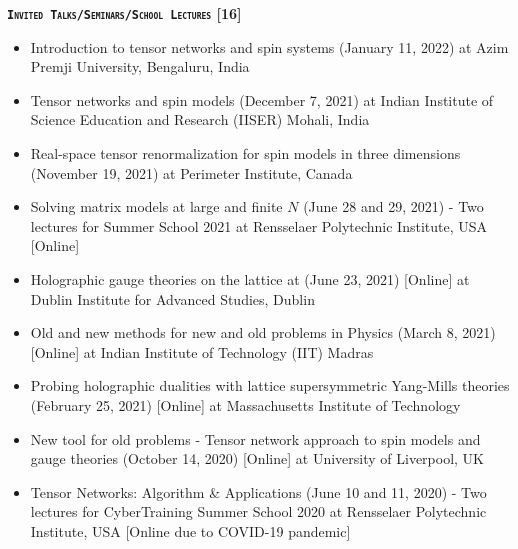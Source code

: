 \renewcommand\ttdefault{cmvtt}
\textcolor{alizarin}{\textbf{\textsc{\fontsize{12}{48} \bfseries \texttt{Invited Talks/Seminars/School Lectures} [16]}}}

\begin{itemize}
 \item Introduction to tensor networks and spin systems 
 (January 11, 2022) at Azim Premji University, Bengaluru, India  
 \item Tensor networks and spin models 
 (December 7, 2021) at Indian Institute of Science Education and Research (IISER) Mohali, India 
 \href{https://rgjha.github.io/talks/IISERM_071221.pdf}{{\texttt{}}} 
  \item Real-space tensor renormalization for spin models in three dimensions 
 (November 19, 2021) at Perimeter Institute, Canada
 \item Solving matrix models at large and finite $N$ (June 28 and 29, 2021) - Two lectures for 
Summer School 2021 at Rensselaer Polytechnic Institute, USA [Online] 
 \href{https://rgjha.github.io/talks/RPI_2021_Lec1_2.pdf}{{\texttt{\COL{[Lecture 1 \& 2]}}}}  
 \item Holographic gauge theories on the lattice at 
 (June 23, 2021) [Online] at Dublin Institute for Advanced Studies, Dublin
 \href{https://rgjha.github.io/talks/DIAS_230621.pdf}{{\texttt{}}} 
  \href{https://youtu.be/JzeWm-ykDPk}{{\texttt{}}}
 \item Old and new methods for new and old problems in Physics
 (March 8, 2021) [Online] at Indian Institute of Technology (IIT) Madras
 \href{https://rgjha.github.io/talks/Collo_IITM.pdf}{{\texttt{}}} 
 \item Probing holographic dualities with lattice supersymmetric Yang-Mills theories 
 (February 25, 2021) [Online] at Massachusetts Institute of Technology
 \href{https://rgjha.github.io/talks/MIT_v2.pdf}{{\texttt{}}} 
 \href{http://y2u.be/fO8A18uwYIM}{{\texttt{}}}
 \item New tool for old problems - Tensor network approach to spin models and gauge theories 
 (October 14, 2020) [Online] at University of Liverpool, UK
 \href{https://rgjha.github.io/talks/Seminar_v2.pdf}{{\texttt{}}} 
 \item Tensor Networks: Algorithm \& Applications (June 10 and 11, 2020) - Two lectures for 
 CyberTraining Summer School 2020 at Rensselaer Polytechnic Institute, USA [Online due to COVID-19 pandemic] 

\end{itemize}
